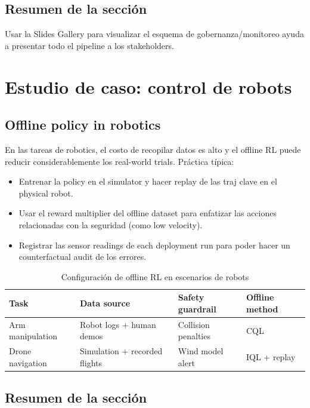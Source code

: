 \documentclass[a4paper]{article}
\begin{document}
\subsection{Resumen de la sección}

Usar la Slides Gallery para visualizar el esquema de gobernanza/monitoreo ayuda a presentar todo el pipeline a los stakeholders.

\section{Estudio de caso: control de robots}

\subsection{Offline policy in robotics}

En las tareas de robotics, el costo de recopilar datos es alto y el offline RL puede reducir considerablemente los real-world trials. Práctica típica:

\begin{itemize}
    \item Entrenar la policy en el simulator y hacer replay de las traj clave en el physical robot.
    \item Usar el reward multiplier del offline dataset para enfatizar las acciones relacionadas con la seguridad (como low velocity).
    \item Registrar las sensor readings de each deployment run para poder hacer un counterfactual audit de los errores.
\end{itemize}

\begin{table}[H]
\centering
\begin{tabular}{p{} p{} p{} p{}}
\toprule
Task & Data source & Safety guardrail & Offline method \\
\midrule
Arm manipulation & Robot logs + human demos & Collision penalties & CQL \\
Drone navigation & Simulation + recorded flights & Wind model alert & IQL + replay \\
\bottomrule
\end{tabular}
\caption{Configuración de offline RL en escenarios de robots}
\end{table}

\subsection{Resumen de la sección}
\end{document}
